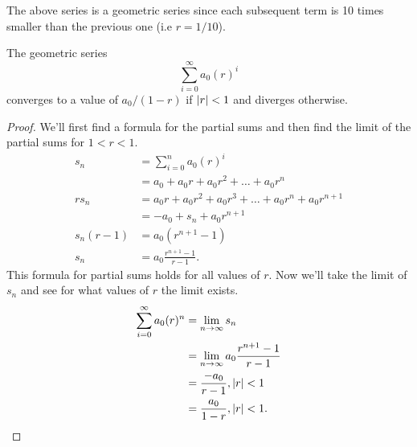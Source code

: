\noindent
The above series is a geometric series since each subsequent term is 10 times smaller than the previous one (i.e $r=1/10$).
\begin{lemma}
	The geometric series
	\begin{equation*}
		\sum_{i=0}^{\infty}{a_0(r)^i}
	\end{equation*}
	converges to a value of $a_0/(1-r)$ if $\lvert r \rvert < 1$ and diverges otherwise.
\end{lemma}
\begin{proof}
	We'll first find a formula for the partial sums and then find the limit of the partial sums for $1 < r < 1$.
	\begin{align*}
		s_n &= \sum_{i=0}^{n}{a_0(r)^i} \\
		&= a_0 + a_0r + a_0r^2 + \ldots + a_0r^n \\
		rs_n &= a_0r + a_0r^2 + a_0r^3 + \ldots + a_0r^n + a_0r^{n+1} \\
		&= -a_0 + s_n + a_0r^{n+1} \\
		s_n(r-1) &= a_0\left(r^{n+1} - 1\right) \\
		s_n &= a_0\frac{r^{n+1}-1}{r-1}.
	\end{align*}
	This formula for partial sums holds for all values of $r$.
	Now we'll take the limit of $s_n$ and see for what values of $r$ the limit exists.
	\begin{align*}
		\sum_{i=0}^{\infty}{a_0(r)^n} &= \lim_{n\to\infty}{s_n} \\
		&= \lim_{n\to\infty}{a_0\frac{r^{n+1}-1}{r-1}} \\
		&= \frac{-a_0}{r-1}, \lvert r \rvert < 1 \\
		&= \frac{a_0}{1-r}, \lvert r \rvert < 1.
	\end{align*}
\end{proof}

